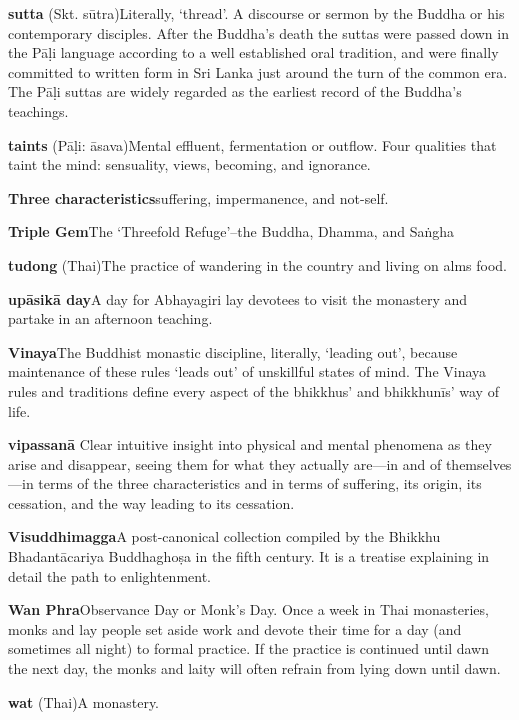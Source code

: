 {\textbf{sutta} (Skt. sūtra)\hspace{\glosskip}Literally, `thread'. A discourse or sermon 
by the Buddha or his contemporary disciples. After the Buddha's death 
the suttas were passed down in the Pāḷi language according to a well 
established oral tradition, and were finally committed to written form 
in Sri Lanka just around the turn of the common era. The Pāḷi suttas 
are widely regarded as the earliest record of the Buddha's teachings.

\textbf{taints} (Pāḷi: āsava)\hspace{\glosskip}Mental effluent, fermentation or 
outflow. Four qualities that taint the mind: sensuality, views, 
becoming, and ignorance.

\textbf{Three characteristics}\hspace{\glosskip}suffering, impermanence, and not-self.

\textbf{Triple Gem}\hspace{\glosskip}The `Threefold Refuge'–the Buddha, Dhamma, and 
Saṅgha

\textbf{tudong} (Thai)\hspace{\glosskip}The practice of wandering in the country and 
living on alms food.

\textbf{upāsikā day}\hspace{\glosskip}A day for Abhayagiri lay devotees to visit the 
monastery and partake in an afternoon teaching.

\textbf{Vinaya}\hspace{\glosskip}The Buddhist monastic discipline, literally, `leading 
out', because maintenance of these rules `leads out' of unskillful 
states of mind. The Vinaya rules and traditions define every aspect of 
the bhikkhus' and bhikkhunīs' way of life.

\textbf{vipassanā}\hspace{\glosskip} Clear intuitive insight into physical and mental 
phenomena as they arise and disappear, seeing them for what they 
actually are---in and of themselves---in terms of the three 
characteristics and in terms of suffering, its origin, its cessation, 
and the way leading to its cessation.

\textbf{Visuddhimagga}\hspace{\glosskip}A post-canonical collection compiled by the 
Bhikkhu Bhadantācariya Buddhaghoṣa in the fifth century. It is a 
treatise explaining in detail the path to enlightenment.

\textbf{Wan Phra}\hspace{\glosskip}Observance Day or Monk's Day. Once a week in Thai 
monasteries, monks and lay people set aside work and devote their time 
for a day (and sometimes all night) to formal practice. If the practice 
is continued until dawn the next day, the monks and laity will often 
refrain from lying down until dawn.

\textbf{wat} (Thai)\hspace{\glosskip}A monastery.
}
